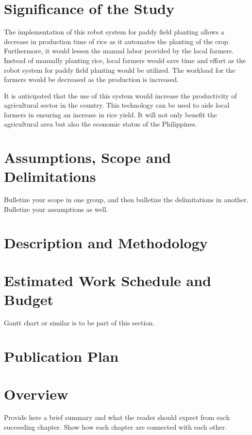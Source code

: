 \section{Significance of the Study}

The implementation of this robot system for paddy field planting allows a decrease in production time of rice as it automates the planting of the crop. Furthermore, it would lessen the manual labor provided by the local farmers. Instead of manually planting rice, local farmers would save time and effort as the robot system for paddy field planting would be utilized. The workload for the farmers would be decreased as the production is increased.

It is anticipated that the use of this system would increase the productivity of agricultural sector in the country. This technology can be used to aide local farmers in ensuring an increase in rice yield. It will not only benefit the agricultural area but also the economic status of the Philippines.





\section{Assumptions, Scope and Delimitations}

Bulletize your scope in one group, and then bulletize the delimitations in another.  Bulletize your assumptions as well.


\section{Description and Methodology}

\blindtext


\ifFinished
\else

\section{Estimated Work Schedule and Budget}

Gantt chart or similar is to be part of this section.

\blindtext

\section{Publication Plan}
\blindtext

\fi


\section{Overview}

Provide here a brief summary and what the reader should expect from each succeeding chapter.  Show how each chapter are connected with each other.

